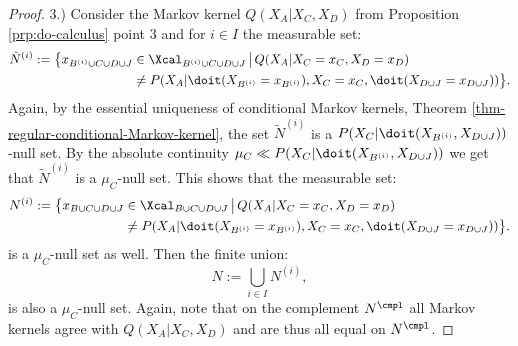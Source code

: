 \begin{proof}
3.) Consider the Markov kernel $Q(X_A|X_C,X_D)$ from Proposition \ref{prp:do-calculus} point 3 and
for $i \in I$ the measurable set:
\begin{align*}
    \tilde N^{(i)} := \bigl\{ x_{B^{(i)} \cup C \cup D \cup J} &\in \Xcal_{B^{(i)} \cup C \cup D \cup J} \,\big|\,
        Q(X_A|X_C=x_C,X_D=x_D)\\ 
       &\neq P(X_A|\doit(X_{B^{(i)}}=x_{B^{(i)}}),X_C=x_C,\doit(X_{D\cup J}=x_{D \cup J})) \bigr\}.
\end{align*}
Again, by the essential uniqueness of conditional Markov kernels, Theorem \ref{thm-regular-conditional-Markov-kernel}, the set $\tilde N^{(i)}$ is a $P(X_C|\doit(X_{B^{(i)}},X_{D\cup J}))$-null set. By the absolute continuity $ \mu_C \ll P(X_C|\doit(X_{B^{(i)}},X_{D\cup J}))$ we get that $\tilde N^{(i)}$ is a $\mu_C$-null set. This shows that the measurable set:
\begin{align*}
    N^{(i)} := \bigl\{ x_{B \cup C \cup D \cup J} &\in \Xcal_{B \cup C \cup D \cup J} \,\big|\,
        Q(X_A|X_C=x_C,X_D=x_D)\\ 
       &\neq P(X_A|\doit(X_{B^{(i)}}=x_{B^{(i)}}),X_C=x_C,\doit(X_{D\cup J}=x_{D \cup J})) \bigr\}.
\end{align*}
is a $\mu_C$-null set as well. Then the finite union:
 \[ N := \bigcup_{i \in I} N^{(i)}, \]
 is also a $\mu_C$-null set. 
Again, note that on the complement $N^\cmpl$ all Markov kernels agree with $Q(X_A|X_C,X_D)$ and are thus all equal on $N^\cmpl$.
\end{proof}
